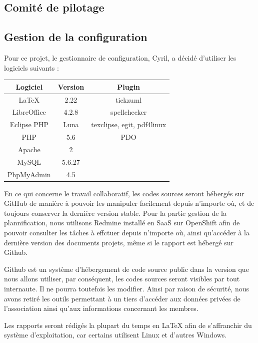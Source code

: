 \documentclass[11pt]{report}
\begin{document}
\subsection{Comité de pilotage}

\subsection{Gestion de la configuration}
Pour ce projet, le gestionnaire de configuration, Cyril, a décidé d'utiliser
les logiciels suivants : \\ 
\par 
\begin{tabular}{ | c | c | c | }
\hline 
   Logiciel & Version & Plugin  \\ \hline 
   LaTeX & 2.22 & tickzuml \\ \hline 
   LibreOffice & 4.2.8 & spellchecker \\ \hline 
   Eclipse PHP & Luna & texclipse, egit, pdf4linux \\ \hline
   PHP & 5.6 & PDO \\ \hline
   Apache & 2 & \\ \hline
   MySQL & 5.6.27 & \\ \hline
   PhpMyAdmin & 4.5 & \\ \hline
 \end{tabular}
 
 \par En ce qui concerne le travail collaboratif, les codes sources seront
 hébergés sur GitHub de manière à pouvoir les manipuler facilement depuis
 n'importe où, et de toujours conserver la dernière version stable. Pour la
 partie gestion de la plannification, nous utilisons Redmine installé en SaaS
 sur OpenShift afin de pouvoir consulter les tâches à effctuer depuis n'importe
 où, ainsi qu'accéder à la dernière version des documents projets, même si le
 rapport est hébergé sur Github.
 \par Github est un système d'hébergement de code source public dans la version 
 que nous allons utiliser, par conséquent, les codes sources seront visibles 
 par tout internaute. Il ne pourra toutefois les modifier. Ainsi par raison de
 sécurité, nous avons retiré les outils permettant à un tiers d'accéder aux
 données privées de l'association ainsi qu'aux informations concernant les
 membres.
 \par Les rapports seront rédigés la plupart du temps en LaTeX afin de
 s'affranchir du système d'exploitation, car certains utilisent Linux et
 d'autres Windows. 
\end{document}
